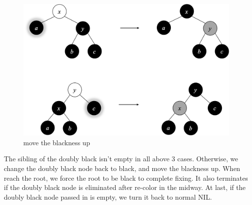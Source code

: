 \documentclass[b5paper]{article}
\begin{document}
\begin{figure}[htbp]
  \centering
  \includegraphics[scale=0.4]{../../../datastruct/tree/red-black-tree/img/del-case3.png}
  \caption{move the blackness up}
  \label{fig:del-case3}
\end{figure}

The sibling of the doubly black isn't empty in all above 3 cases. Otherwise, we change the doubly black node back to black, and move the blackness up. When reach the root, we force the root to be black to complete fixing. It also terminates if the doubly black node is eliminated after re-color in the midway. At last, if the doubly black node passed in is empty, we turn it back to normal NIL.
\end{document}
